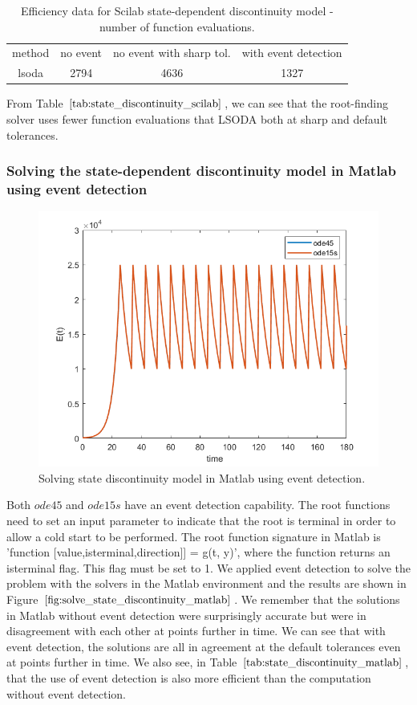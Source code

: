 \begin{table}[h]
\caption {Efficiency data for Scilab state-dependent discontinuity model - number of function evaluations.} \label{tab:state_discontinuity_scilab}
\begin{center}
\begin{tabular}{ c c c c } 
method & no event & no event with sharp tol. & with event detection \\ 
lsoda & 2794 & 4636 & 1327 \\
\end{tabular}
\end{center}
\end{table}

From Table $\ref{tab:state_discontinuity_scilab}$, we can see that the root-finding solver uses fewer function evaluations that LSODA both at sharp and default tolerances.

\subsubsection{Solving the state-dependent discontinuity model in Matlab using event detection}
\begin{figure}[H]
\centering
\includegraphics[width=0.7\linewidth]{./figures/solve_state_discontinuity_matlab}
\caption{Solving state discontinuity model in Matlab using event detection.}
\label{fig:solve_state_discontinuity_matlab}
\end{figure}
Both $ode45$ and $ode15s$ have an event detection capability. The root functions need to set an input parameter to indicate that the root is terminal in order to allow a cold start to be performed. The root function signature in Matlab is 'function [value,isterminal,direction]] = g(t, y)', where the function returns an isterminal flag. This flag must be set to 1. We applied event detection to solve the problem with the solvers in the Matlab environment and the results are shown in Figure $\ref{fig:solve_state_discontinuity_matlab}$. We remember that the solutions in Matlab without event detection were surprisingly accurate but were in disagreement with each other at points further in time. We can see that with event detection, the solutions are all in agreement at the default tolerances even at points further in time. We also see, in Table $\ref{tab:state_discontinuity_matlab}$, that the use of event detection is also more efficient than the computation without event detection.

